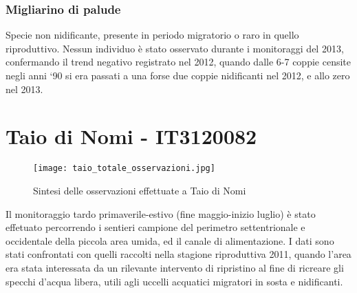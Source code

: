 \documentclass[11pt,a4paper,twoside]{memoir}
\begin{document}
\subsubsection{Migliarino di palude}
Specie non nidificante, presente in periodo migratorio o raro in quello riproduttivo. 
Nessun individuo è stato osservato durante i monitoraggi del 2013, confermando il trend negativo registrato nel 2012, quando dalle 6-7 coppie censite negli anni ‘90 si era passati a una forse due coppie nidificanti nel 2012, e allo zero nel 2013.

\newpage
\section{Taio di Nomi - IT3120082}

\vspace*{\fill}
\begin{figure}[H]
  \centering
  \texttt{[image: taio\_totale\_osservazioni.jpg]}
  \caption{Sintesi delle osservazioni effettuate a Taio di Nomi}
\end{figure}\vspace*{\fill}
Il monitoraggio tardo primaverile-estivo (fine maggio-inizio luglio) è stato effetuato percorrendo i sentieri campione del perimetro settentrionale e occidentale della piccola area umida, ed il canale di alimentazione.  I dati sono stati confrontati con quelli raccolti nella stagione riproduttiva 2011, quando l'area era stata interessata da un rilevante intervento di ripristino al fine di ricreare gli specchi d'acqua libera, utili agli uccelli acquatici migratori in sosta e nidificanti.  
\end{document}
